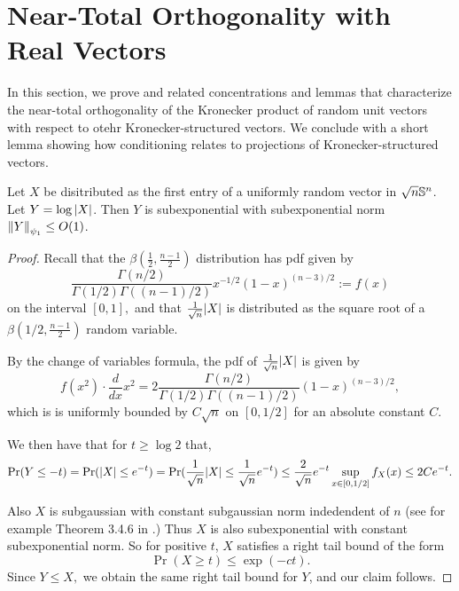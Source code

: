 

\section{Near-Total Orthogonality with Real Vectors}
\label{sec:kron-unit-vec-conentration}

In this section, we prove  and related concentrations and lemmas that characterize the near-total orthogonality of the Kronecker product of random unit vectors with respect to otehr Kronecker-structured vectors.
We conclude with a short lemma showing how conditioning relates to projections of Kronecker-structured vectors.

\begin{lemma}
\label{lem:log-beta-subexponential}
Let \(X\) be disitributed as the first entry of a uniformly random vector in \(\sqrt{n}{\mathbb S}^n\).
Let \(Y = \log \vert{X}\vert\).
Then \(Y\) is subexponential with subexponential norm \(\norm{Y}_{\psi_1} \leq O(1)\).
\end{lemma}
\begin{proof}



Recall that the $\beta(\frac12, \frac{n-1}{2})$ distribution has pdf given by
\[
\frac{\Gamma(n/2)}{\Gamma(1/2)\Gamma((n-1)/2)}x^{-1/2}(1-x)^{(n-3)/2} := f(x)
\]
on the interval $[0,1],$ and that $\frac{1}{\sqrt{n}}\vert{X}\vert$ is distributed as the square root of a $\beta(1/2, \frac{n-1}{2})$ random variable.  

By the change of variables formula, the pdf of $\frac{1}{\sqrt{n}}\vert{X}\vert$ is given by 
\[
f(x^2) \cdot \frac{d}{dx} x^2
= 2\frac{\Gamma(n/2)}{\Gamma(1/2)\Gamma((n-1)/2)} (1-x)^{(n-3)/2},
\]
which is is uniformly bounded by $C\sqrt{n}$ on $[0,1/2]$ for an absolute constant $C.$

 We then have that for $t \geq \log 2$ that,
 \[
 \Pr(Y \leq -t)
 = \Pr(\vert{X}\vert \leq e^{-t})
 = \Pr(\frac{1}{\sqrt{n}} \vert{X}\vert \leq \frac{1}{\sqrt{n}}e^{-t})
 \leq \frac{2}{\sqrt{n}}e^{-t} \sup_{x \in [0,1/2]} f_X(x)
 \leq 2Ce^{-t}.
 \]

 Also $X$ is subgaussian with constant subgaussian norm indedendent of $n$ (see for example Theorem 3.4.6 in \cite{vershynin2018high}.)  Thus $X$ is also subexponential with constant subexponential norm.  So for positive $t$, $X$ satisfies a right tail bound of the form 
 \[
 \Pr(X \geq t) \leq \exp(-ct).
 \]
 Since $Y \leq X,$ we obtain the same right tail bound for $Y$, and our claim follows.
\end{proof}

